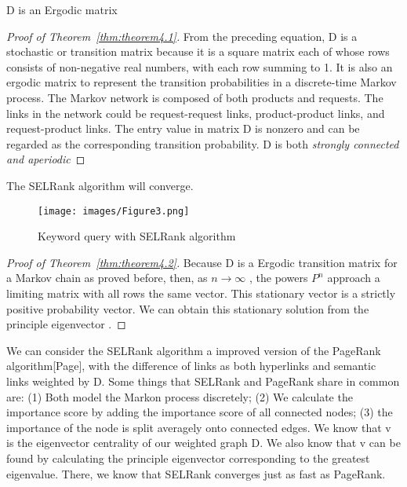 \documentclass[sigconf]{acmart}
\begin{document}
\begin{theorem}\label{thm:theorem4.1}
D is an Ergodic matrix
\end{theorem}

\begin{proof}[Proof of Theorem~\ref{thm:theorem4.1}]
From the preceding equation, D is a stochastic or transition matrix because it is a square matrix each of whose rows consists of non-negative real numbers, with each row summing to 1. It is also an ergodic matrix to represent the transition probabilities in a discrete-time Markov process. The Markov network is composed of both products and requests. The links in the network could be request-request links, product-product links, and request-product links. The entry value in matrix D is nonzero and can be regarded as the corresponding transition probability. D is both \textit{strongly connected and aperiodic}
\end{proof}

\begin{theorem}\label{thm:theorem4.2}
The SELRank algorithm will converge.
\end{theorem}
\begin{figure}
    \centering
    \texttt{[image: images/Figure3.png]}
    \caption{Keyword query with SELRank algorithm}
    \label{fig:3}
\end{figure}

\begin{proof}[Proof of Theorem~\ref{thm:theorem4.2}]
Because D is a Ergodic transition matrix for a Markov chain as proved before, then, as $n\rightarrow \infty$ , the powers $P^n$ approach a limiting matrix with all rows the same vector. This stationary vector is a strictly positive probability vector. We can obtain this stationary solution from the principle eigenvector \cite{berkhin2005survey} \cite{Langville:2005:SEM:1055334.1055396}. 
\end{proof}

We can consider the SELRank algorithm a improved version of the PageRank algorithm[Page], with the difference of links as both hyperlinks and semantic links weighted by D. Some things that SELRank and PageRank share in common are: (1) Both model the Markon process discretely; (2) We calculate the importance score by adding the importance score of all connected nodes; (3) the importance of the node is split averagely onto connected edges. We know that v is the eigenvector centrality of our weighted graph D. We also know that v can be found by calculating the principle eigenvector corresponding to the greatest eigenvalue. There, we know that SELRank converges just as fast as PageRank. 
\end{document}
